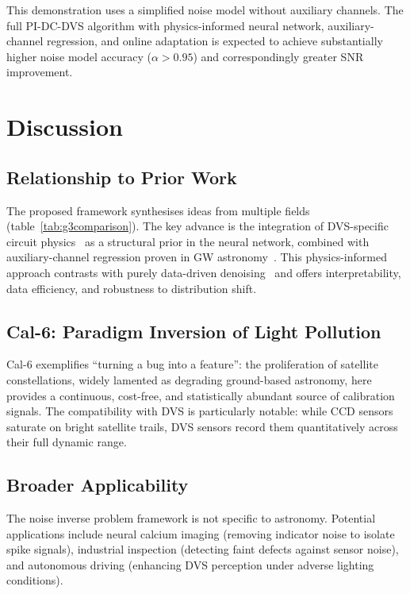 \documentclass[12pt]{article}
\begin{document}
This demonstration uses a simplified noise model without auxiliary channels.
The full PI-DC-DVS algorithm with physics-informed neural network, auxiliary-channel regression, and online adaptation is expected to achieve substantially higher noise model accuracy ($\alpha > 0.95$) and correspondingly greater SNR improvement.


\section{Discussion}
\label{sec:discussion}

\subsection{Relationship to Prior Work}

The proposed framework synthesises ideas from multiple fields (table~\ref{tab:g3comparison}).
The key advance is the integration of DVS-specific circuit physics~\cite{A5} as a structural prior in the neural network, combined with auxiliary-channel regression proven in GW astronomy~\cite{D1,D6}.
This physics-informed approach contrasts with purely data-driven denoising~\cite{B5,B6,B7} and offers interpretability, data efficiency, and robustness to distribution shift.

\subsection{Cal-6: Paradigm Inversion of Light Pollution}

Cal-6 exemplifies ``turning a bug into a feature'': the proliferation of satellite constellations, widely lamented as degrading ground-based astronomy, here provides a continuous, cost-free, and statistically abundant source of calibration signals.
The compatibility with DVS is particularly notable: while CCD sensors saturate on bright satellite trails, DVS sensors record them quantitatively across their full dynamic range.

\subsection{Broader Applicability}

The noise inverse problem framework is not specific to astronomy.
Potential applications include neural calcium imaging (removing indicator noise to isolate spike signals), industrial inspection (detecting faint defects against sensor noise), and autonomous driving (enhancing DVS perception under adverse lighting conditions).
\end{document}
